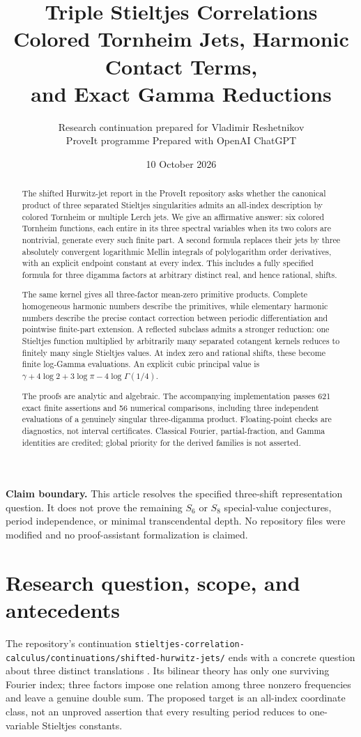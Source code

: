 \documentclass[11pt]{article}
\title{\textbf{Triple Stieltjes Correlations}\\[5pt]
\large Colored Tornheim Jets, Harmonic Contact Terms,\\
and Exact Gamma Reductions}
\author{Research continuation prepared for Vladimir Reshetnikov\\
\small ProveIt programme \quad\textbullet\quad Prepared with OpenAI ChatGPT}
\date{10 October 2026}
\numberwithin{equation}{section}
\theoremstyle{definition}\newtheorem{definition}[theorem]{Definition}
\theoremstyle{remark}\newtheorem{remark}[theorem]{Remark}
\newcommand{\src}[1]{\nolinkurl{#1}}
\begin{document}
\maketitle
\begin{abstract}
The shifted Hurwitz-jet report in the ProveIt repository asks whether the
canonical product of three separated Stieltjes singularities admits an
all-index description by colored Tornheim or multiple Lerch jets. We give
an affirmative answer: six colored Tornheim functions, each entire in its
three spectral variables when its two colors are nontrivial, generate every
such finite part. A second formula replaces their jets by three absolutely
convergent logarithmic Mellin integrals of polylogarithm order derivatives,
with an explicit endpoint constant at every index. This includes a fully
specified formula for three digamma factors at arbitrary distinct real,
and hence rational, shifts.

The same kernel gives all three-factor mean-zero primitive products. Complete homogeneous
harmonic numbers describe the primitives, while elementary harmonic numbers
describe the precise contact correction between periodic differentiation
and pointwise finite-part extension. A reflected subclass admits a stronger
reduction: one Stieltjes function multiplied by arbitrarily many separated
cotangent kernels reduces to finitely many single Stieltjes values. At
index zero and rational shifts, these become finite log-Gamma evaluations.
An explicit cubic principal value is
$\gamma+4\log2+3\log\pi-4\log\Gamma(1/4)$.

The proofs are analytic and algebraic. The accompanying implementation passes
621 exact finite assertions and 56 numerical comparisons, including three
independent evaluations of a genuinely singular three-digamma product.
Floating-point checks are diagnostics, not interval certificates. Classical
Fourier, partial-fraction, and Gamma identities are credited; global priority
for the derived families is not asserted.
\end{abstract}
\vspace{5pt}
\noindent\textbf{Claim boundary.} This article resolves the specified
three-shift representation question. It does not prove the remaining
$S_6$ or $S_8$ special-value conjectures, period independence, or minimal
transcendental depth. No repository files were modified and no
proof-assistant formalization is claimed.
\clearpage
\tableofcontents
\clearpage
\section{Research question, scope, and antecedents}\label{tsc:scope}
The repository's continuation
\src{stieltjes-correlation-calculus/continuations/shifted-hurwitz-jets/}
ends with a concrete question about three distinct translations
\cite{tsc:shj}. Its bilinear theory has only one surviving Fourier index;
three factors impose one relation among three nonzero frequencies and leave
a genuine double sum. The proposed target is an all-index coordinate class,
not an unproved assertion that every resulting period reduces to one-variable
Stieltjes constants.
\end{document}
